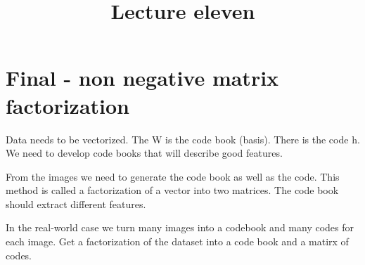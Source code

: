 \documentclass[letterpaper, 9pt]{article}
\title{Lecture eleven}
\begin{document}
\maketitle
\section{Final - non negative matrix factorization}
Data needs to be vectorized. The W is the code book (basis). There is the code h. We need to develop code books that will describe good features.

From the images we need to generate the code book as well as the code. This method is called a factorization of a vector into two matrices. The code book should extract different features.

In the real-world case we turn many images into a codebook and many codes for each image. Get a factorization of the dataset into a code book and a matirx of codes.
\end{document}

